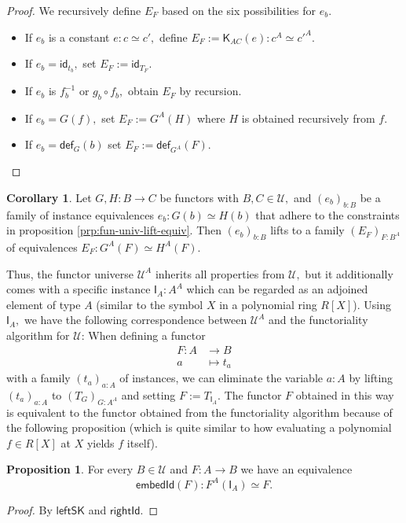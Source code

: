 \documentclass[a4paper]{article}
\theoremstyle{definition}
\newtheorem{proposition}[definition]{Proposition}
\newtheorem{corollary}[definition]{Corollary}
\theoremstyle{remark}
\renewcommand{\equiv}{\simeq}
\newcommand{\U}{\mathcal{U}}
\newcommand{\nm}{\mathsf}
\newcommand{\id}{\nm{id}}
\newcommand{\fndef}[1]{\nm{def}_{#1}}
\newcommand{\combinator}{\nm}
\newcommand{\idFun}{\combinator{I}}
\newcommand{\constFun}{\combinator{K}}
\begin{document}
\begin{proof}
  We recursively define $E_F$ based on the six possibilities for $e_b.$
  \begin{itemize}
    \item If $e_b$ is a constant $e : c \equiv c',$ define
    $E_F := \constFun_{AC}(e) : c^A \equiv c'^A.$
    \item If $e_b = \id_{t_b},$ set $E_F := \id_{T_F}.$
    \item If $e_b$ is $f_b^{-1}$ or $g_b \circ f_b,$ obtain $E_F$ by recursion.
    \item If $e_b = G(f),$ set $E_F := G^A(H)$ where $H$ is obtained recursively
    from $f.$
    \item If $e_b = \fndef{G}(b)$ set $E_F := \fndef{G^A}(F).$ \qedhere
  \end{itemize}
\end{proof}

\begin{corollary}
  \label{cor:fun-univ-lift-equiv}
  Let $G,H : B \to C$ be functors with $B,C \in \U,$ and $(e_b)_{b : B}$ be a
  family of instance equivalences $e_b : G(b) \equiv H(b)$ that adhere to the
  constraints in proposition \ref{prp:fun-univ-lift-equiv}. Then $(e_b)_{b : B}$
  lifts to a family $(E_F)_{F : B^A}$ of equivalences $E_F : G^A(F) \equiv H^A(F).$
\end{corollary}

\vspace{1ex}
Thus, the functor universe $\U^A$ inherits all properties from $\U,$ but it
additionally comes with a specific instance $\idFun_A : A^A$ which can be
regarded as an adjoined element of type $A$ (similar to the symbol $X$ in a
polynomial ring $R[X]$). Using $\idFun_A,$ we have the following correspondence
between $\U^A$ and the functoriality algorithm for $\U$: When defining a functor
\begin{align*}
  F : A &\to     B\\
      a &\mapsto t_a
\end{align*}
with a family $(t_a)_{a : A}$ of instances, we can eliminate the variable
$a : A$ by lifting $(t_a)_{a : A}$ to $(T_G)_{G : A^A}$ and setting $F := T_{\idFun_A}.$
The functor $F$ obtained in this way is equivalent to the functor obtained from
the functoriality algorithm because of the following proposition (which is quite
similar to how evaluating a polynomial $f \in R[X]$ at $X$ yields $f$ itself).
\begin{proposition}
  For every $B \in \U$ and $F : A \to B$ we have an equivalence
  \[\nm{embedId}(F) : F^A(\idFun_A) \equiv F.\]
\end{proposition}
\vspace{-2ex}
\begin{proof}
  By $\nm{leftSK}$ and $\nm{rightId}.$
\end{proof}
\end{document}
